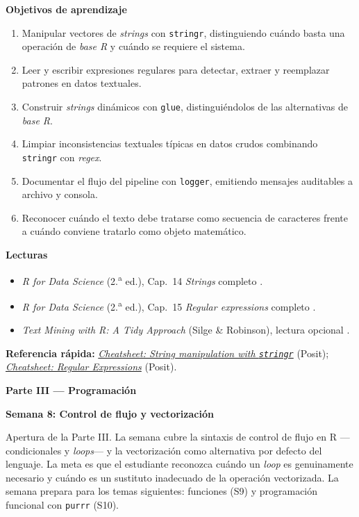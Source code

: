 \documentclass[11pt,letterpaper]{article}
\newcommand{\parteCurso}[1]{%
  \clearpage%
  \vspace*{0.5cm}%
  {\centering\color{main}\fontsize{26pt}{32pt}\selectfont\bfseries #1\par}%
  \vspace{0.8cm}%
}
\newcommand{\semana}[2]{%
  \bigskip%
  {\color{main}\Large\bfseries Semana #1: #2\par}%
  \smallskip%
}
\newcommand{\cheatsheet}[2]{%
  \href{https://rstudio.github.io/cheatsheets/#1.pdf}{\textit{Cheatsheet: #2}}%
}
\begin{document}
\medskip
\noindent\textbf{Objetivos de aprendizaje}
\begin{enumerate}[leftmargin=*, itemsep=1pt]
    \item Manipular vectores de \textit{strings} con \texttt{stringr}, distinguiendo cuándo basta una operación de \textit{base R} y cuándo se requiere el sistema.
    \item Leer y escribir expresiones regulares para detectar, extraer y reemplazar patrones en datos textuales.
    \item Construir \textit{strings} dinámicos con \texttt{glue}, distinguiéndolos de las alternativas de \textit{base R}.
    \item Limpiar inconsistencias textuales típicas en datos crudos combinando \texttt{stringr} con \textit{regex}.
    \item Documentar el flujo del pipeline con \texttt{logger}, emitiendo mensajes auditables a archivo y consola.
    \item Reconocer cuándo el texto debe tratarse como secuencia de caracteres frente a cuándo conviene tratarlo como objeto matemático.
\end{enumerate}

\medskip
\noindent\textbf{Lecturas}
\begin{itemize}[leftmargin=*, itemsep=1pt]
    \item \textit{R for Data Science} (2.\textsuperscript{a} ed.), Cap.\ 14 \textit{Strings} completo \cite{wickham2023r4ds}.
    \item \textit{R for Data Science} (2.\textsuperscript{a} ed.), Cap.\ 15 \textit{Regular expressions} completo \cite{wickham2023r4ds}.
    \item \textit{Text Mining with R: A Tidy Approach} (Silge \& Robinson), lectura opcional \cite{silge-tidytext}.
\end{itemize}

\medskip
\noindent\textbf{Referencia rápida:} \cheatsheet{strings}{String manipulation with \texttt{stringr}} (Posit); \cheatsheet{regex}{Regular Expressions} (Posit).

\parteCurso{Parte III --- Programación}

\semana{8}{Control de flujo y vectorización}

Apertura de la Parte III. La semana cubre la sintaxis de control de flujo en R ---condicionales y \textit{loops}--- y la vectorización como alternativa por defecto del lenguaje. La meta es que el estudiante reconozca cuándo un \textit{loop} es genuinamente necesario y cuándo es un sustituto inadecuado de la operación vectorizada. La semana prepara para los temas siguientes: funciones (S9) y programación funcional con \texttt{purrr} (S10).
\end{document}
